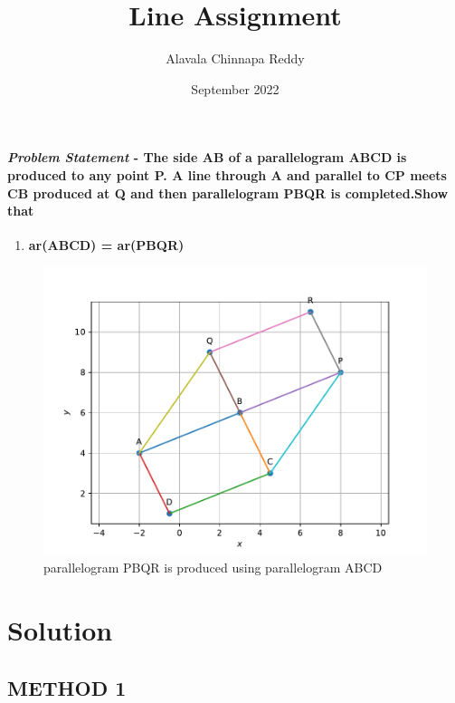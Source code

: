 \documentclass[journal,10pt,twocolumn]{article}
\title{\textbf{Line Assignment}}
\author{Alavala Chinnapa Reddy}
\date{September 2022}
\begin{document}
\maketitle
\paragraph{\textit{Problem Statement} - The side AB of a parallelogram ABCD is produced to any point P. A line through A and parallel to CP meets CB produced at Q and then parallelogram PBQR is completed.Show that}
\begin{enumerate}
  \item \textbf{ar(ABCD) = ar(PBQR)}
\end{enumerate}

\begin{figure}[h]
\centering
\includegraphics[width=1\columnwidth]{figs/l1.pdf}
\caption{parallelogram PBQR is produced using parallelogram ABCD}
\end{figure}

\section*{Solution}
\subsection*{METHOD 1}
\end{document}

